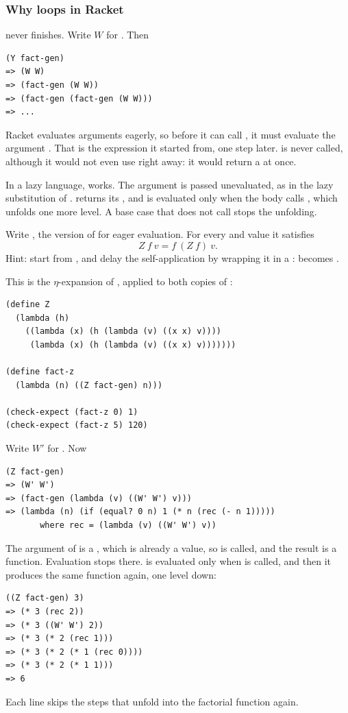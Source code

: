 \subsubsection{Why  loops in Racket}  never finishes. Write $W$ for . Then
\begin{lstlisting}[style=repl]
(Y fact-gen)
=> (W W)
=> (fact-gen (W W))
=> (fact-gen (fact-gen (W W)))
=> ...
\end{lstlisting}
Racket evaluates arguments eagerly, so before it can call , it must evaluate the argument . That is the expression it started from, one step later.  is never called, although it would not even use  right away: it would return a  at once.

In a lazy language,  works. The argument  is passed unevaluated, as in the lazy substitution of .  returns its , and  is evaluated only when the body calls , which unfolds one more level. A base case that does not call  stops the unfolding.

\begin{exercise}
Write , the version of  for eager evaluation. For every  and value  it satisfies
\[
Z\ f\ v = f\ (Z\ f)\ v.
\]
Hint: start from , and delay the self-application by wrapping it in a :  becomes .
\end{exercise}
\begin{solution}
This is the $\eta$-expansion of , applied to both copies of :
\begin{lstlisting}
(define Z
  (lambda (h)
    ((lambda (x) (h (lambda (v) ((x x) v))))
     (lambda (x) (h (lambda (v) ((x x) v)))))))

(define fact-z
  (lambda (n) ((Z fact-gen) n)))

(check-expect (fact-z 0) 1)
(check-expect (fact-z 5) 120)
\end{lstlisting}
Write $W'$ for . Now
\begin{lstlisting}[style=repl]
(Z fact-gen)
=> (W' W')
=> (fact-gen (lambda (v) ((W' W') v)))
=> (lambda (n) (if (equal? 0 n) 1 (* n (rec (- n 1)))))
       where rec = (lambda (v) ((W' W') v))
\end{lstlisting}
The argument of  is a , which is already a value, so  is called, and the result is a function. Evaluation stops there.  is evaluated only when  is called, and then it produces the same function again, one level down:
\begin{lstlisting}[style=repl]
((Z fact-gen) 3)
=> (* 3 (rec 2))
=> (* 3 ((W' W') 2))
=> (* 3 (* 2 (rec 1)))
=> (* 3 (* 2 (* 1 (rec 0))))
=> (* 3 (* 2 (* 1 1)))
=> 6
\end{lstlisting}
Each line skips the steps that unfold  into the factorial function again.
\end{solution}

